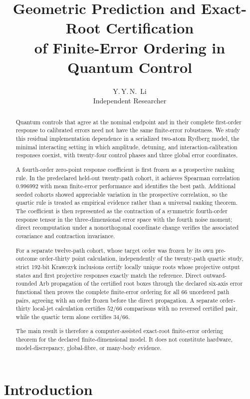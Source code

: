 \documentclass[11pt]{article}
\title{\textbf{
Geometric Prediction and Exact-Root Certification\\ of Finite-Error Ordering in Quantum Control
}}
\author{Y.\,Y.\,N.\ Li\\
\small Independent Researcher}
\date{}
\begin{document}
\maketitle

\begin{abstract}
Quantum controls that agree at the nominal endpoint and in their complete
first-order response to calibrated errors need not have the same finite-error
robustness. We study this residual implementation dependence in a serialized
two-atom Rydberg model, the minimal interacting setting in which amplitude,
detuning, and interaction-calibration responses coexist, with twenty-four
control phases and three global error coordinates.

A fourth-order zero-point response coefficient is first frozen as a
prospective ranking rule. In the predeclared held-out twenty-path cohort, it
achieves Spearman correlation $0.996992$ with mean finite-error performance
and identifies the best path. Additional seeded cohorts showed appreciable
variation in the prospective correlation, so the quartic rule is treated as
empirical evidence rather than a universal ranking theorem. The coefficient
is then represented as
the contraction of a symmetric fourth-order response tensor in the
three-dimensional error space with the fourth noise moment; direct
recomputation under a nonorthogonal coordinate change verifies the
associated covariance and contraction invariance.

For a separate twelve-path cohort, whose target order was frozen by its own
pre-outcome order-thirty point calculation, independently of the twenty-path
quartic study, strict 192-bit Krawczyk inclusions certify
locally unique roots whose projective output states and first projective
responses exactly match the reference. Direct outward-rounded Arb propagation
of the certified root boxes through the declared six-axis error functional
then proves the complete finite-error ordering for all $66$ unordered path
pairs, agreeing with an order frozen before the direct propagation. A
separate order-thirty local-jet calculation certifies $52/66$ comparisons
with no reversed certified pair, while the quartic term alone certifies
$34/66$.

The main result is therefore a computer-assisted exact-root finite-error
ordering theorem for the declared finite-dimensional model. It does not
constitute hardware, model-discrepancy, global-fibre, or many-body
evidence.
\end{abstract}

\section{Introduction}
\end{document}
